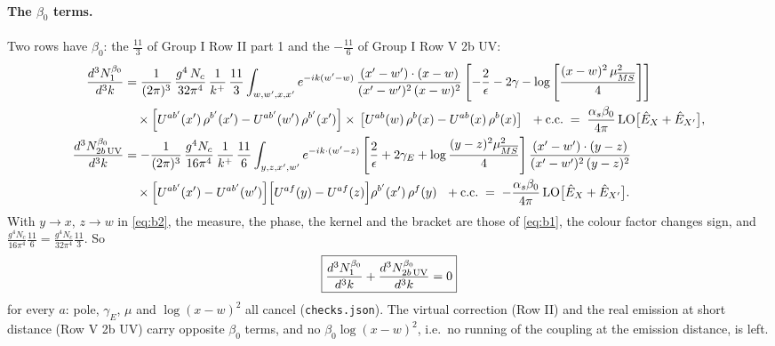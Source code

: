 \documentclass[10pt]{article}
\numberwithin{equation}{section}
\begin{document}
\paragraph{The $\beta_0$ terms.} Two rows have $\beta_0$: the $\frac{11}{3}$ of Group I Row II part 1 and the $-\frac{11}{6}$ of Group I Row V 2b UV:
\begin{align}
\frac{d^{3}N^{\beta_0}_{1}}{d^{3}k}&=\frac{1}{(2\pi)^{3}}\,\frac{g^{4}\,N_{c}}{32\pi^{4}}\,\frac{1}{k^{+}}\,\frac{11}{3}\int_{w,w',x,x'}e^{-ik(w'-w)}\,\frac{(x'-w')\cdot (x-w)}{(x'-w')^{2}\, (x-w)^{2}}\left[-\frac{2}{\epsilon}-2\gamma-\log{\left[\frac{(x-w)^{2}\,\mu^{2}_{\overline{MS}}}{4}\right]}\right]\notag\\
&\quad\times\left[U^{ab'}(x')\,\rho^{b'}(x') - U^{ab'}(w')\,\rho^{b'}(x')\right]\times\,\left[U^{ab}(w)\,\rho^{b}(x) - U^{ab}(x)\,\rho^{b}(x)\right]\ \ +{\rm c.c.}\;=\;\frac{\alpha_s\beta_0}{4\pi}\,{\rm LO}\big[\hat E_X+\hat E_{X'}\big],\label{eq:b1}\\
\frac{d^{3}N^{\beta_0}_{2b\,\rm UV}}{d^{3}k}&=-\frac{1}{(2\pi)^{3}}\,\frac{g^{4}N_{c}}{16\pi^{4}}\,\frac{1}{k^{+}}\,\frac{11}{6}\int_{y,z,x',w'}e^{-ik\cdot(w'-z)}\left[\frac{2}{\epsilon}+2\gamma_{E}+\log\frac{(y-z)^{2}\mu^{2}_{\overline{MS}}}{4}\right]\frac{(x'-w')\cdot(y-z)}{(x'-w')^{2}\,(y-z)^{2}}\notag\\
&\quad\times\Big[U^{ab'}(x')-U^{ab'}(w')\Big]\Big[U^{af}(y)-U^{af}(z)\Big]\rho^{b'}(x')\,\rho^{f}(y)\ \ +{\rm c.c.}\;=\;-\frac{\alpha_s\beta_0}{4\pi}\,{\rm LO}\big[\hat E_X+\hat E_{X'}\big].\label{eq:b2}
\end{align}
With $y\to x$, $z\to w$ in \eqref{eq:b2}, the measure, the phase, the kernel and the bracket are those of \eqref{eq:b1}, the colour factor changes sign, and $\frac{g^4N_c}{16\pi^4}\frac{11}{6}=\frac{g^4N_c}{32\pi^4}\frac{11}{3}$. So
\begin{equation}
\boxed{\frac{d^{3}N^{\beta_0}_{1}}{d^{3}k}+\frac{d^{3}N^{\beta_0}_{2b\,\rm UV}}{d^{3}k}=0}
\end{equation}
for every $a$: pole, $\gamma_E$, $\mu$ and $\log(x-w)^2$ all cancel (\texttt{checks.json}). The virtual correction (Row II) and the real emission at short distance (Row V 2b UV) carry opposite $\beta_0$ terms, and no $\beta_0\log(x-w)^2$, i.e.\ no running of the coupling at the emission distance, is left.
\end{document}
